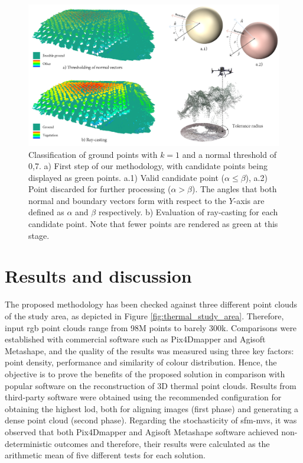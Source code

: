 \begin{figure}
    \centering
    \includegraphics{figs/thermal_projection/thermal_classification_result.png}
	\caption{Classification of ground points with $k = 1$ and a normal threshold of 0,7. a) First step of our methodology, with candidate points being displayed as green points. a.1) Valid candidate point ($\alpha \leq \beta$), a.2) Point discarded for further processing ($\alpha > \beta$). The angles that both normal and boundary vectors form with respect to the $Y$-axis are defined as $\alpha$ and $\beta$ respectively. b) Evaluation of ray-casting for each candidate point. Note that fewer points are rendered as green at this stage. }
	\label{fig:thermal_ground_classification}
\end{figure}

\section{Results and discussion}
\label{Results and discussion}

The proposed methodology has been checked against three different point clouds of the study area, as depicted in Figure \ref{fig:thermal_study_area}. Therefore, input \acrshort{rgb} point clouds range from 98M points to barely 300k. Comparisons were established with commercial software such as Pix4Dmapper and Agisoft Metashape, and the quality of the results was measured using three key factors: point density, performance and similarity of colour distribution. Hence, the objective is to prove the benefits of the proposed solution in comparison with popular software on the reconstruction of 3D thermal point clouds. Results from third-party software were obtained using the recommended configuration for obtaining the highest \acrshort{lod}, both for aligning images (first phase) and generating a dense point cloud (second phase). Regarding the stochasticity of \acrshort{sfm}-\acrshort{mvs}, it was observed that both Pix4Dmapper and Agisoft Metashape software achieved non-deterministic outcomes and therefore, their results were calculated as the arithmetic mean of five different tests for each solution.

